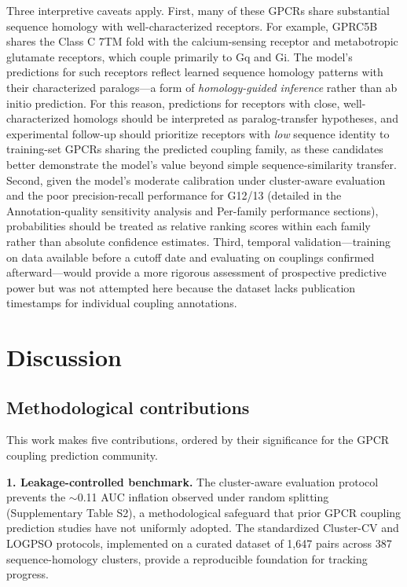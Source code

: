 \documentclass[11pt,a4paper]{article}
\begin{document}
Three interpretive caveats apply. First, many of these GPCRs share substantial sequence homology with well-characterized receptors. For example, GPRC5B shares the Class C 7TM fold with the calcium-sensing receptor and metabotropic glutamate receptors, which couple primarily to Gq and Gi. The model's predictions for such receptors reflect learned sequence homology patterns with their characterized paralogs---a form of \emph{homology-guided inference} rather than ab initio prediction. For this reason, predictions for receptors with close, well-characterized homologs should be interpreted as paralog-transfer hypotheses, and experimental follow-up should prioritize receptors with \emph{low} sequence identity to training-set GPCRs sharing the predicted coupling family, as these candidates better demonstrate the model's value beyond simple sequence-similarity transfer. Second, given the model's moderate calibration under cluster-aware evaluation and the poor precision-recall performance for G12/13 (detailed in the Annotation-quality sensitivity analysis and Per-family performance sections), probabilities should be treated as relative ranking scores within each family rather than absolute confidence estimates. Third, temporal validation---training on data available before a cutoff date and evaluating on couplings confirmed afterward---would provide a more rigorous assessment of prospective predictive power but was not attempted here because the dataset lacks publication timestamps for individual coupling annotations.

\section{Discussion}

\subsection{Methodological contributions}

This work makes five contributions, ordered by their significance for the GPCR coupling prediction community.

\textbf{1. Leakage-controlled benchmark.} The cluster-aware evaluation protocol prevents the $\sim$0.11 AUC inflation observed under random splitting (Supplementary Table S2), a methodological safeguard that prior GPCR coupling prediction studies have not uniformly adopted. The standardized Cluster-CV and LOGPSO protocols, implemented on a curated dataset of 1,647 pairs across 387 sequence-homology clusters, provide a reproducible foundation for tracking progress.
\end{document}
